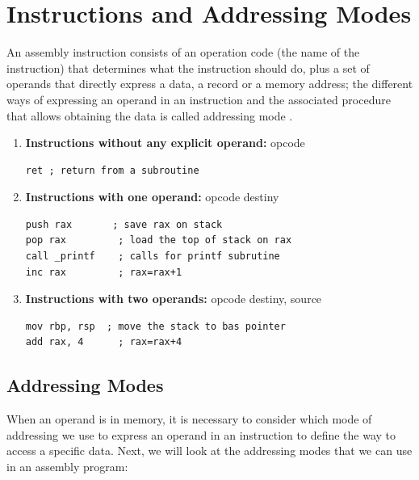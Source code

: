 \section{Instructions and Addressing Modes}
An assembly instruction consists of an operation code (the name of the instruction) that determines what the instruction should do, plus a set of operands that directly express a data, a record or a memory address; the different ways of expressing an operand in an instruction and the associated procedure that allows obtaining the data is called addressing mode \cite{book:EstComp}. 
\begin{enumerate}
\item \textbf{Instructions without any explicit operand:} opcode \\
\begin{verbatim}
ret	; return from a subroutine
\end{verbatim}

\item \textbf{Instructions with one operand:} opcode destiny\\
\begin{verbatim}
push rax 	   ; save rax on stack
pop rax         ; load the top of stack on rax
call _printf    ; calls for printf subrutine
inc rax         ; rax=rax+1
\end{verbatim}

\item \textbf{Instructions with two operands:} opcode destiny, source\\
\begin{verbatim}
mov rbp, rsp  ; move the stack to bas pointer
add rax, 4      ; rax=rax+4
\end{verbatim}
\end{enumerate}

\subsection{Addressing Modes}
When an operand is in memory, it is necessary to consider which mode of addressing we use to express an operand in an instruction to define the way to access a specific data. Next, we will look at the addressing modes that we can use in an assembly program:

